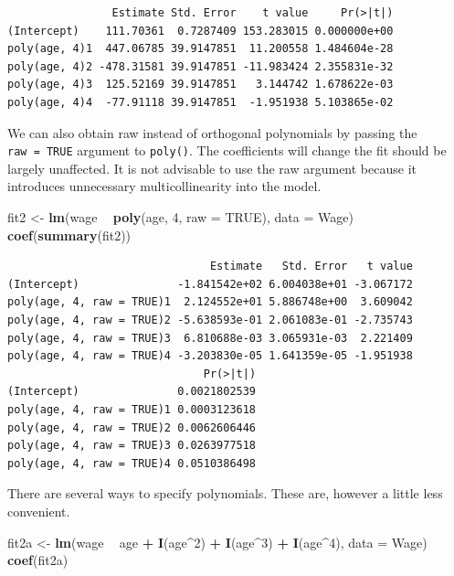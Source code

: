 \documentclass[]{article}
\newenvironment{Shaded}{\begin{snugshade}}{\end{snugshade}}
\newcommand{\DataTypeTok}[1]{\textcolor[rgb]{0.13,0.29,0.53}{#1}}
\newcommand{\DecValTok}[1]{\textcolor[rgb]{0.00,0.00,0.81}{#1}}
\newcommand{\KeywordTok}[1]{\textcolor[rgb]{0.13,0.29,0.53}{\textbf{#1}}}
\newcommand{\NormalTok}[1]{#1}
\newcommand{\OperatorTok}[1]{\textcolor[rgb]{0.81,0.36,0.00}{\textbf{#1}}}
\newcommand{\OtherTok}[1]{\textcolor[rgb]{0.56,0.35,0.01}{#1}}
\newcommand{\StringTok}[1]{\textcolor[rgb]{0.31,0.60,0.02}{#1}}
\begin{document}
\begin{verbatim}
                Estimate Std. Error    t value     Pr(>|t|)
(Intercept)    111.70361  0.7287409 153.283015 0.000000e+00
poly(age, 4)1  447.06785 39.9147851  11.200558 1.484604e-28
poly(age, 4)2 -478.31581 39.9147851 -11.983424 2.355831e-32
poly(age, 4)3  125.52169 39.9147851   3.144742 1.678622e-03
poly(age, 4)4  -77.91118 39.9147851  -1.951938 5.103865e-02
\end{verbatim}

We can also obtain raw instead of orthogonal polynomials by passing the \texttt{raw\ =\ TRUE} argument to \texttt{poly()}. The coefficients will change the fit should be largely unaffected. It is not advisable to use the raw argument because it introduces unnecessary multicollinearity into the model.

\begin{Shaded}
\begin{Highlighting}[]
\NormalTok{fit2 <-}\StringTok{ }\KeywordTok{lm}\NormalTok{(wage }\OperatorTok{~}\StringTok{ }\KeywordTok{poly}\NormalTok{(age, }\DecValTok{4}\NormalTok{, }\DataTypeTok{raw =} \OtherTok{TRUE}\NormalTok{), }\DataTypeTok{data =}\NormalTok{ Wage)}
\KeywordTok{coef}\NormalTok{(}\KeywordTok{summary}\NormalTok{(fit2))}
\end{Highlighting}
\end{Shaded}

\begin{verbatim}
                               Estimate   Std. Error   t value
(Intercept)               -1.841542e+02 6.004038e+01 -3.067172
poly(age, 4, raw = TRUE)1  2.124552e+01 5.886748e+00  3.609042
poly(age, 4, raw = TRUE)2 -5.638593e-01 2.061083e-01 -2.735743
poly(age, 4, raw = TRUE)3  6.810688e-03 3.065931e-03  2.221409
poly(age, 4, raw = TRUE)4 -3.203830e-05 1.641359e-05 -1.951938
                              Pr(>|t|)
(Intercept)               0.0021802539
poly(age, 4, raw = TRUE)1 0.0003123618
poly(age, 4, raw = TRUE)2 0.0062606446
poly(age, 4, raw = TRUE)3 0.0263977518
poly(age, 4, raw = TRUE)4 0.0510386498
\end{verbatim}

There are several ways to specify polynomials. These are, however a little less convenient.

\begin{Shaded}
\begin{Highlighting}[]
\NormalTok{fit2a <-}\StringTok{ }\KeywordTok{lm}\NormalTok{(wage }\OperatorTok{~}\StringTok{ }\NormalTok{age }\OperatorTok{+}\StringTok{ }\KeywordTok{I}\NormalTok{(age}\OperatorTok{^}\DecValTok{2}\NormalTok{) }\OperatorTok{+}\StringTok{ }\KeywordTok{I}\NormalTok{(age}\OperatorTok{^}\DecValTok{3}\NormalTok{) }\OperatorTok{+}\StringTok{ }\KeywordTok{I}\NormalTok{(age}\OperatorTok{^}\DecValTok{4}\NormalTok{), }\DataTypeTok{data =}\NormalTok{ Wage)}
\KeywordTok{coef}\NormalTok{(fit2a)}
\end{Highlighting}
\end{Shaded}
\end{document}
